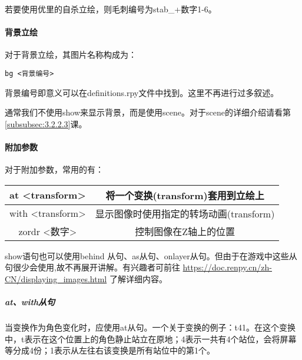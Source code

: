 若要使用优里的自杀立绘，则毛刺编号为stab\_+数字1-6。

\paragraph{背景立绘}

对于背景立绘，其图片名称构成为：
\begin{lstlisting}
bg <背景编号>
\end{lstlisting}

背景编号即意义可以在definitions.rpy文件中找到。这里不再进行过多叙述。

\begin{ExtraKnowledge}
通常我们不使用show来显示背景，而是使用scene。对于scene的详细介绍请看第\ref{subsubsec:3.2.2.3}课。
\end{ExtraKnowledge}

\paragraph{附加参数}

对于附加参数，常用的有：
\begin{center}
    \tabletail{\hline}
    \tablelasttail{\hline}
    \begin{supertabular}{|c|c|}
        \hline
        at <transform> & 将一个变换(transform)套用到立绘上\\
        \hline
        with <transform> & 显示图像时使用指定的转场动画(transform)\\
        \hline
        zordr <数字> & 控制图像在Z轴上的位置\\
        \hline
    \end{supertabular}
\end{center}

\begin{ExtraKnowledge}
show语句也可以使用behind 从句、as从句、onlayer从句。但由于在游戏中这些从句很少会使用,故不再展开讲解。有兴趣者可前往 \url{https://doc.renpy.cn/zh-CN/displaying_images.html} 了解详细内容。
\end{ExtraKnowledge}

\subparagraph{at、with从句}
\label{subsubsec:3.2.2.1}
当变换作为角色变化时，应使用at从句。一个关于变换的例子：t41。在这个变换中，t表示在这个位置上的角色静止站立在原地；4表示一共有4个站位，会将屏幕等分成4份；1表示从左往右该变换是所有站位中的第1个。

